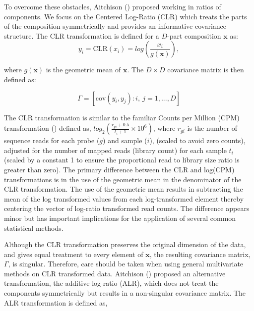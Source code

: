 \documentclass [10pt]{article}
\theoremstyle{definition}
\begin{document}
To overcome these obstacles, Aitchison (\citeyear{Aitchison1980}) proposed working in ratios of components. We focus on the Centered Log-Ratio (CLR) which treats the parts of the composition symmetrically and provides an informative covariance structure.  The CLR transformation is defined for a $D$-part composition $\mathbf{x}$ as:
\begin{equation}
y_i  = \text{CLR}(x_i) = log \left(\frac{x_i}{g(\mathbf{x})} \right),
\label{clr}
\end{equation}

where $g(\mathbf{x})$ is the geometric mean of $\mathbf{x}$.  The $D \times D$ covariance matrix is then defined as:

\begin{equation}
\Gamma = \left[\text{cov}\left(y_i, y_j \right): i,\ j = 1, ..., D \right]
\label{gamma}
\end{equation}


The CLR transformation is similar to the familiar Counts per Million (CPM) transformation (\cite{Law2014}) defined as, $log_2 \left(\frac{r_{gi}+0.5}{t_i+1} \times 10^6 \right)$, where $r_{gi}$ is the number of sequence reads for each probe ($g$) and sample ($i$), (scaled to avoid zero counts), adjusted for the number of mapped reads (library count) for each sample $t_i$ (scaled by a constant 1 to ensure the proportional read to library size ratio is greater than zero). The primary difference between the CLR and log(CPM) transformations is in the use of the geometric mean in the denominator of the CLR transformation. The use of the geometric mean results in subtracting the mean of the log transformed values from each log-transformed element thereby centering the vector of log-ratio transformed read counts. The difference appears minor but has important implications for the application of several common statistical methods.

Although the CLR transformation preserves the original dimension of the data, and gives equal treatment to every element of $\mathbf{x}$, the resulting covariance matrix, $\Gamma$, is singular.  Therefore, care should be taken when using general multivariate methods on CLR transformed data. Aitchison (\citeyear{Aitchison1986}) proposed an alternative transformation, the additive log-ratio (ALR), which does not treat the components symmetrically but results in a non-singular covariance matrix.  The ALR transformation is defined as,
\end{document}
